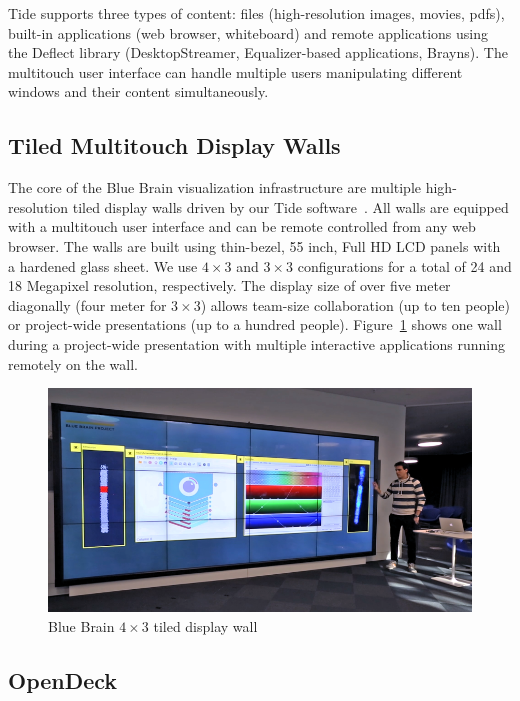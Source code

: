 \documentclass[10pt]{llncs}
\newcommand{\fig}[1]{Figure~\ref{#1}}
\begin{document}
Tide supports three types of content: files (high-resolution images, movies,
pdfs), built-in applications (web browser, whiteboard) and remote applications
using the Deflect library (DesktopStreamer, Equalizer-based applications,
Brayns). The multitouch user interface can handle multiple users manipulating
different windows and their content simultaneously.

\subsection{Tiled Multitouch Display Walls}

The core of the Blue Brain visualization infrastructure are multiple
high-resolution tiled display walls driven by our Tide software~\cite{tide}. All
walls are equipped with a multitouch user interface and can be remote controlled
from any web browser. The walls are built using thin-bezel, 55 inch, Full HD LCD
panels with a hardened glass sheet. We use $4\times 3$ and $3\times 3$
configurations for a total of 24 and 18 Megapixel resolution, respectively. The
display size of over five meter diagonally (four meter for $3\times 3$) allows
team-size collaboration (up to ten people) or project-wide presentations (up to
a hundred people). \fig{fTDW} shows one wall during a project-wide presentation
with multiple interactive applications running remotely on the wall.

\begin{figure}[h!t]
  \includegraphics[width=\columnwidth]{images/tdw}
  \caption{\label{fTDW}Blue Brain $4\times 3$ tiled display wall}
\end{figure}

\subsection{OpenDeck}
\end{document}
